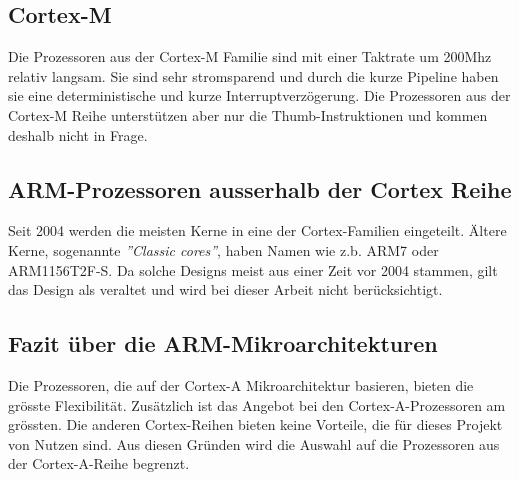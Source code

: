 \subsection{Cortex-M}
Die Prozessoren aus der Cortex-M Familie sind mit einer Taktrate um 200Mhz relativ langsam.
Sie sind sehr stromsparend und durch die kurze Pipeline haben sie eine deterministische und kurze Interruptverzögerung.
Die Prozessoren aus der Cortex-M Reihe unterstützen aber nur die Thumb-Instruktionen und kommen deshalb nicht in Frage.

\subsection{ARM-Prozessoren ausserhalb der Cortex Reihe}
Seit 2004 werden die meisten Kerne in eine der Cortex-Familien eingeteilt.
Ältere Kerne, sogenannte \textit{''Classic cores''}, haben Namen wie z.b. ARM7 oder ARM1156T2F-S.
Da solche Designs meist aus einer Zeit vor 2004 stammen, gilt das Design als veraltet und wird bei dieser Arbeit nicht berücksichtigt.

\subsection{Fazit über die ARM-Mikroarchitekturen}
Die Prozessoren, die auf der Cortex-A Mikroarchitektur basieren, bieten die grösste Flexibilität.
Zusätzlich ist das Angebot bei den Cortex-A-Prozessoren am grössten.
Die anderen Cortex-Reihen bieten keine Vorteile, die für dieses Projekt von Nutzen sind.
Aus diesen Gründen wird die Auswahl auf die Prozessoren aus der Cortex-A-Reihe begrenzt.

